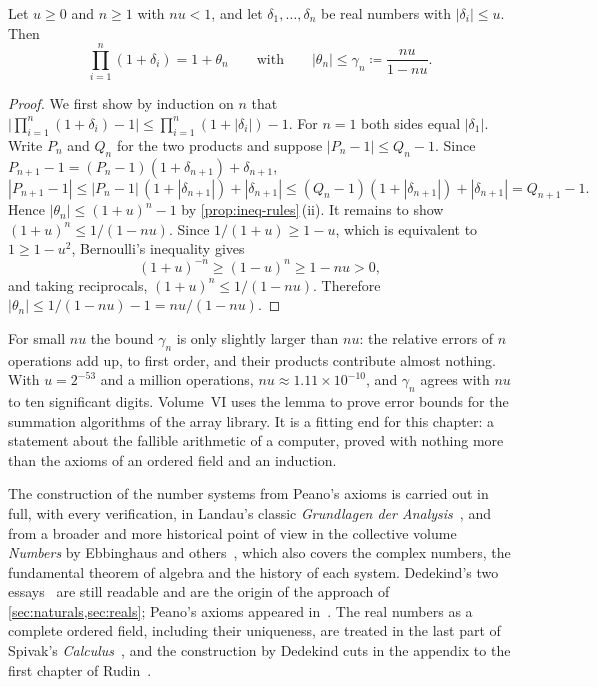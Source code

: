 \begin{lemma}
\label{lem:gamma}
Let $u\ge0$ and $n\ge1$ with $nu<1$, and let $\delta_1,\ldots,\delta_n$ be real numbers with $|\delta_i|\le u$. Then
\[
\prod_{i=1}^n(1+\delta_i)=1+\theta_n\qquad\text{with}\qquad|\theta_n|\le\gamma_n\coloneqq\frac{nu}{1-nu}.
\]
\end{lemma}

\begin{proof}
We first show by induction on $n$ that $\bigl|\prod_{i=1}^n(1+\delta_i)-1\bigr|\le\prod_{i=1}^n(1+|\delta_i|)-1$. For $n=1$ both sides equal $|\delta_1|$. Write $P_n$ and $Q_n$ for the two products and suppose $|P_n-1|\le Q_n-1$. Since $P_{n+1}-1=(P_n-1)(1+\delta_{n+1})+\delta_{n+1}$,
\[
|P_{n+1}-1|\le|P_n-1|\,(1+|\delta_{n+1}|)+|\delta_{n+1}|\le(Q_n-1)(1+|\delta_{n+1}|)+|\delta_{n+1}|=Q_{n+1}-1 .
\]
Hence $|\theta_n|\le(1+u)^n-1$ by \cref{prop:ineq-rules}\,(ii). It remains to show $(1+u)^n\le1/(1-nu)$. Since $1/(1+u)\ge1-u$, which is equivalent to $1\ge1-u^2$, Bernoulli's inequality gives
\[
(1+u)^{-n}\ge(1-u)^n\ge1-nu>0 ,
\]
and taking reciprocals, $(1+u)^n\le1/(1-nu)$. Therefore $|\theta_n|\le1/(1-nu)-1=nu/(1-nu)$.
\end{proof}

For small $nu$ the bound $\gamma_n$ is only slightly larger than $nu$: the relative errors of $n$ operations add up, to first order, and their products contribute almost nothing. With $u=2^{-53}$ and a million operations, $nu\approx1.11\times10^{-10}$, and $\gamma_n$ agrees with $nu$ to ten significant digits. Volume~VI uses the lemma to prove error bounds for the summation algorithms of the array library. It is a fitting end for this chapter: a statement about the fallible arithmetic of a computer, proved with nothing more than the axioms of an ordered field and an induction.

\chapternotes

The construction of the number systems from Peano's axioms is carried out in full, with every verification, in Landau's classic \emph{Grundlagen der Analysis}~\cite{landau1930}, and from a broader and more historical point of view in the collective volume \emph{Numbers} by Ebbinghaus and others~\cite{ebbinghaus1991}, which also covers the complex numbers, the fundamental theorem of algebra and the history of each system. Dedekind's two essays~\cite{dedekind1872,dedekind1888} are still readable and are the origin of the approach of \cref{sec:naturals,sec:reals}; Peano's axioms appeared in~\cite{peano1889}. The real numbers as a complete ordered field, including their uniqueness, are treated in the last part of Spivak's \emph{Calculus}~\cite{spivak2008calculus}, and the construction by Dedekind cuts in the appendix to the first chapter of Rudin~\cite{rudin1976}.

